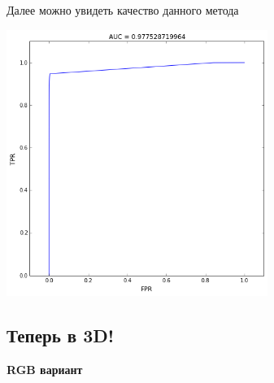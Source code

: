 \documentclass[12pt, a4paper]{article}
\begin{document}
			Далее можно увидеть качество данного метода
			\begin{center}
				\includegraphics[width=8.5cm]{2par_auc.png}
			\end{center}

		\newpage
		\subsection{Теперь в 3D!}
			{\bf RGB вариант}
\end{document}
